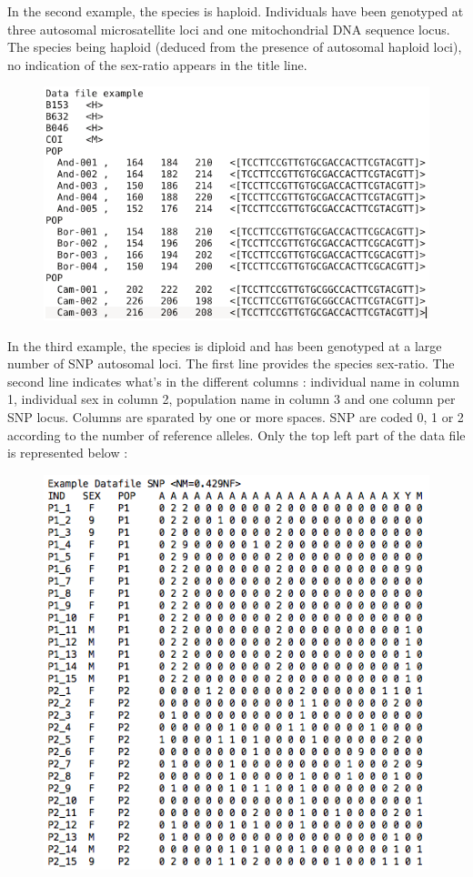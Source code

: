 In the second example, the species is haploid. Individuals have been genotyped at three autosomal microsatellite loci and one mitochondrial DNA sequence locus. The species being haploid (deduced from the presence of autosomal haploid loci), no indication of the sex-ratio appears in the title line.

\begin{figure}[h]
\includegraphics[scale=0.5]{gui_pictures/screenga002.png}
\end{figure}

In the third example, the species is diploid and has been genotyped at a large number of SNP autosomal loci. The first line provides the species sex-ratio. The second line indicates what's in the different columns : individual name in column 1, individual sex in column 2, population name in column 3 and one column per SNP locus. Columns are sparated by one or more spaces. SNP are coded 0, 1 or 2 according to the number of reference alleles. Only the top left part of the data file is represented below :

\begin{figure}[h]
\includegraphics[scale=0.5]{gui_pictures/screenga003.png}
\end{figure}



